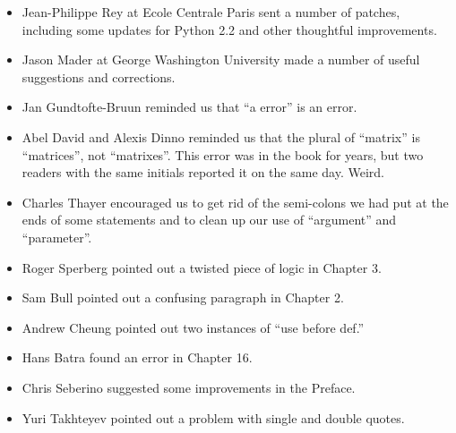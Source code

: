 \begin{itemize}
\item Jean-Philippe Rey at Ecole Centrale
Paris sent a number of patches, including some updates for Python 2.2
and other thoughtful improvements.

\item Jason Mader at George Washington University made a number
of useful suggestions and corrections.

\item Jan Gundtofte-Bruun reminded us that ``a error'' is an error.

\item Abel David and Alexis Dinno reminded us that the plural of
``matrix'' is ``matrices'', not ``matrixes''.  This error was in the
book for years, but two readers with the same initials reported it on
the same day.  Weird.

\item Charles Thayer encouraged us to get rid of the semi-colons
we had put at the ends of some statements and to clean up our
use of ``argument'' and ``parameter''.

\item Roger Sperberg pointed out a twisted piece of logic in Chapter 3.

\item Sam Bull pointed out a confusing paragraph in Chapter 2.

\item Andrew Cheung pointed out two instances of ``use before def.''

\item Hans Batra found an error in Chapter 16.

\item Chris Seberino suggested some improvements in the Preface.

\item Yuri Takhteyev pointed out a problem with single and double quotes.

\end{itemize}





